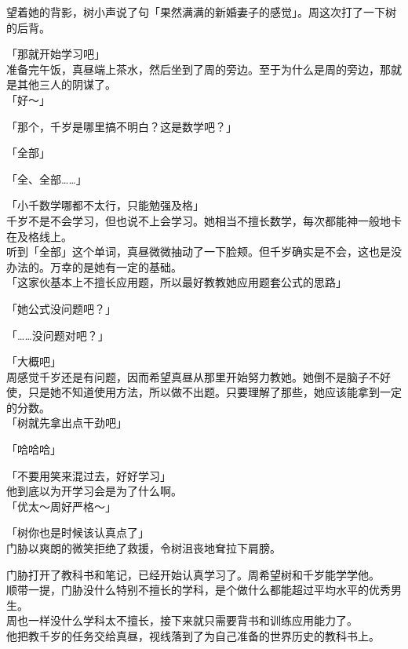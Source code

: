 望着她的背影，树小声说了句「果然满满的新婚妻子的感觉」。周这次打了一下树的后背。\\

\vspace{2\baselineskip}

「那就开始学习吧」\\

准备完午饭，真昼端上茶水，然后坐到了周的旁边。至于为什么是周的旁边，那就是其他三人的阴谋了。\\

「好～」

「那个，千岁是哪里搞不明白？这是数学吧？」

「全部」

「全、全部……」

「小千数学哪都不太行，只能勉强及格」\\

千岁不是不会学习，但也说不上会学习。她相当不擅长数学，每次都能神一般地卡在及格线上。\\

听到「全部」这个单词，真昼微微抽动了一下脸颊。但千岁确实是不会，这也是没办法的。万幸的是她有一定的基础。\\

「这家伙基本上不擅长应用题，所以最好教教她应用题套公式的思路」

「她公式没问题吧？」

「……没问题对吧？」

「大概吧」\\

周感觉千岁还是有问题，因而希望真昼从那里开始努力教她。她倒不是脑子不好使，只是她不知道使用方法，所以做不出题。只要理解了那些，她应该能拿到一定的分数。\\

「树就先拿出点干劲吧」

「哈哈哈」

「不要用笑来混过去，好好学习」\\

他到底以为开学习会是为了什么啊。\\

「优太～周好严格～」

「树你也是时候该认真点了」\\

门胁以爽朗的微笑拒绝了救援，令树沮丧地耷拉下肩膀。

门胁打开了教科书和笔记，已经开始认真学习了。周希望树和千岁能学学他。\\

顺带一提，门胁没什么特别不擅长的学科，是个做什么都能超过平均水平的优秀男生。\\

周也一样没什么学科太不擅长，接下来就只需要背书和训练应用能力了。\\

他把教千岁的任务交给真昼，视线落到了为自己准备的世界历史的教科书上。
